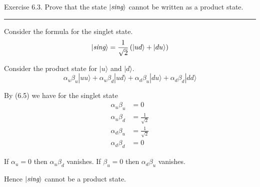 \documentclass[12pt]{article}
\begin{document}
Exercise 6.3.
Prove that the state $|\text{\it sing}\rangle$ cannot be written
as a product state.

\bigskip
\hrule

\bigskip
Consider the formula for the singlet state.
\begin{equation*}
|\text{\it sing}\rangle=\frac{1}{\sqrt2}\left(|ud\rangle+|du\rangle\right)
\end{equation*}

Consider the product state for $|u\rangle$ and $|d\rangle$.
\begin{equation*}
\alpha_u\beta_u|uu\rangle
+\alpha_u\beta_d|ud\rangle
+\alpha_d\beta_u|du\rangle
+\alpha_d\beta_d|dd\rangle
\tag{6.5}
\end{equation*}

By (6.5) we have for the singlet state
\begin{align*}
\alpha_u\beta_u&=0
\\[1ex]
\alpha_u\beta_d&=\frac{1}{\sqrt2}
\\[1ex]
\alpha_d\beta_u&=\frac{1}{\sqrt2}
\\[1ex]
\alpha_d\beta_d&=0
\end{align*}

If $\alpha_u=0$ then $\alpha_u\beta_d$ vanishes.
If $\beta_u=0$ then $\alpha_d\beta_u$ vanishes.

\bigskip
Hence $|\text{\it sing}\rangle$ cannot be a product state.
\end{document}
